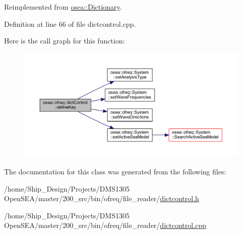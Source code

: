 Reimplemented from \hyperlink{classosea_1_1_dictionary_ae96470181c8b1762204493fa45e96d7c}{osea\-::\-Dictionary}.



Definition at line 66 of file dictcontrol.\-cpp.



Here is the call graph for this function\-:
\nopagebreak
\begin{figure}[H]
\begin{center}
\leavevmode
\includegraphics[width=350pt]{classosea_1_1ofreq_1_1dict_control_a048421f7c1bc9b8a023a159c59407bb9_cgraph}
\end{center}
\end{figure}




The documentation for this class was generated from the following files\-:\begin{DoxyCompactItemize}
\item 
/home/\-Ship\-\_\-\-Design/\-Projects/\-D\-M\-S1305 Open\-S\-E\-A/master/200\-\_\-src/bin/ofreq/file\-\_\-reader/\hyperlink{dictcontrol_8h}{dictcontrol.\-h}\item 
/home/\-Ship\-\_\-\-Design/\-Projects/\-D\-M\-S1305 Open\-S\-E\-A/master/200\-\_\-src/bin/ofreq/file\-\_\-reader/\hyperlink{dictcontrol_8cpp}{dictcontrol.\-cpp}\end{DoxyCompactItemize}
